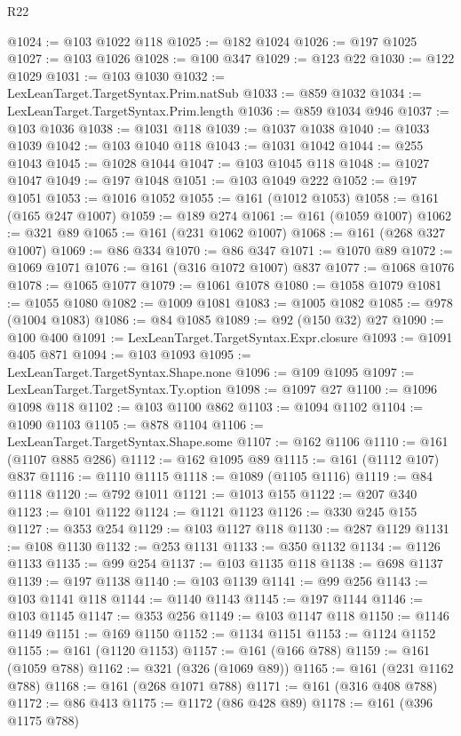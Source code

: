 \begin{lexlean}{R22}
\begin{coremodule}
{{{{{{{{{{{{{{{{{{{{{{{{{{{{{{{{{{{{{{{{{{{{{{{{{{{{@1024 := @103 @1022 @118
@1025 := @182 @1024
@1026 := @197 @1025
@1027 := @103 @1026
@1028 := @100 @347
@1029 := @123 @22
@1030 := @122 @1029
@1031 := @103 @1030
@1032 := LexLeanTarget.TargetSyntax.Prim.natSub
@1033 := @859 @1032
@1034 := LexLeanTarget.TargetSyntax.Prim.length
@1036 := @859 @1034 @946
@1037 := @103 @1036
@1038 := @1031 @118
@1039 := @1037 @1038
@1040 := @1033 @1039
@1042 := @103 @1040 @118
@1043 := @1031 @1042
@1044 := @255 @1043
@1045 := @1028 @1044
@1047 := @103 @1045 @118
@1048 := @1027 @1047
@1049 := @197 @1048
@1051 := @103 @1049 @222
@1052 := @197 @1051
@1053 := @1016 @1052
@1055 := @161 (@1012 @1053)
@1058 := @161 (@165 @247 @1007)
@1059 := @189 @274
@1061 := @161 (@1059 @1007)
@1062 := @321 @89
@1065 := @161 (@231 @1062 @1007)
@1068 := @161 (@268 @327 @1007)
@1069 := @86 @334
@1070 := @86 @347
@1071 := @1070 @89
@1072 := @1069 @1071
@1076 := @161 (@316 @1072 @1007) @837
@1077 := @1068 @1076
@1078 := @1065 @1077
@1079 := @1061 @1078
@1080 := @1058 @1079
@1081 := @1055 @1080
@1082 := @1009 @1081
@1083 := @1005 @1082
@1085 := @978 (@1004 @1083)
@1086 := @84 @1085
@1089 := @92 (@150 @32) @27
@1090 := @100 @400
@1091 := LexLeanTarget.TargetSyntax.Expr.closure
@1093 := @1091 @405 @871
@1094 := @103 @1093
@1095 := LexLeanTarget.TargetSyntax.Shape.none
@1096 := @109 @1095
@1097 := LexLeanTarget.TargetSyntax.Ty.option
@1098 := @1097 @27
@1100 := @1096 @1098 @118
@1102 := @103 @1100 @862
@1103 := @1094 @1102
@1104 := @1090 @1103
@1105 := @878 @1104
@1106 := LexLeanTarget.TargetSyntax.Shape.some
@1107 := @162 @1106
@1110 := @161 (@1107 @885 @286)
@1112 := @162 @1095 @89
@1115 := @161 (@1112 @107) @837
@1116 := @1110 @1115
@1118 := @1089 (@1105 @1116)
@1119 := @84 @1118
@1120 := @792 @1011
@1121 := @1013 @155
@1122 := @207 @340
@1123 := @101 @1122
@1124 := @1121 @1123
@1126 := @330 @245 @155
@1127 := @353 @254
@1129 := @103 @1127 @118
@1130 := @287 @1129
@1131 := @108 @1130
@1132 := @253 @1131
@1133 := @350 @1132
@1134 := @1126 @1133
@1135 := @99 @254
@1137 := @103 @1135 @118
@1138 := @698 @1137
@1139 := @197 @1138
@1140 := @103 @1139
@1141 := @99 @256
@1143 := @103 @1141 @118
@1144 := @1140 @1143
@1145 := @197 @1144
@1146 := @103 @1145
@1147 := @353 @256
@1149 := @103 @1147 @118
@1150 := @1146 @1149
@1151 := @169 @1150
@1152 := @1134 @1151
@1153 := @1124 @1152
@1155 := @161 (@1120 @1153)
@1157 := @161 (@166 @788)
@1159 := @161 (@1059 @788)
@1162 := @321 (@326 (@1069 @89))
@1165 := @161 (@231 @1162 @788)
@1168 := @161 (@268 @1071 @788)
@1171 := @161 (@316 @408 @788)
@1172 := @86 @413
@1175 := @1172 (@86 @428 @89)
@1178 := @161 (@396 @1175 @788)
}}}}}}}}}}}}}}}}}}}}}}}}}}}}}}}}}}}}}}}}}}}}}}}}}}}}
\end{coremodule}
\end{lexlean}
